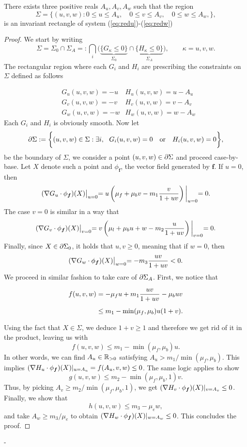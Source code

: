 \begin{proposition}
	There exists three positive reals $A_u, A_v, A_w$ such that the region $$\Sigma = \bigl\{(u, v, w) : 0 \le u \le A_u, \quad 0 \le v \le A_v, \quad  0 \le w \le A_w, \bigr\},$$ is an invariant rectangle of system (\ref{eq:redu})-(\ref{eq:redw})
\end{proposition}

\begin{proof}
	We start by writing $$\Sigma = \Sigma_0 \cap \Sigma_A =: \bigcap_i \biggl( \underbrace{\{G_\kappa \le 0\}}_{\Sigma_0} \cap \underbrace{\{H_\kappa \le 0\}}_{\Sigma_A}\biggr), \qquad \kappa = u, v, w.$$
	The rectangular region where each $G_i$ and $H_i$ are prescribing the constraints on $\Sigma$ defined as follows
	
	\begin{align*}
		& G_u(u, v, w) = -u & H_u(u, v, w) = u - A_u \\[1em]
		& G_v(u, v, w) = -v & H_v(u, v, w) = v - A_v \\[1em]
		& G_w(u, v, w) = -w & H_w(u, v, w) = w - A_w
	\end{align*}
Each $G_i$ and $H_i$ is obviously smooth. Now let $$\partial\Sigma := \biggl\{(u,v,w) \in \Sigma : \exists i, \ \  G_i(u, v, w) = 0 \quad\text{or}\quad H_i(u, v, w) = 0 \biggr\},$$ be the boundary of $\Sigma$, we consider a point  $(u, v, w) \in \partial \Sigma$ and proceed case-by-base. Let $X $ denote such a point and $\phi_{\bm f}$, the vector field generated by $\bm f$. If $u=0$, then $$(\nabla G_u \cdot \phi_{\bm f})(X)\bigl\vert_{u=0} = u \left( \mu_f  + \mu_b v - m_1 \dfrac{v}{1 + uv}\right)\biggl\vert_{u=0} = 0.$$ The case $v= 0$ is similar in a way that
$$(\nabla G_v \cdot \phi_{\bm f})(X)\bigl\vert_{v=0} = v \left( \mu_l  + \mu_b u + w - m_2 \dfrac{u}{1 + uv}\right)\biggl\vert_{v=0} = 0.$$ Finally, since $X \in \partial\Sigma_0$, it holds that $u, v \ge 0$, meaning that if $w=0$, then $$(\nabla G_w \cdot \phi_{\bm f})(X)\bigl\vert_{w=0} = -m_3 \dfrac{uv}{1 + uv} < 0.$$ We proceed in similar fashion to take care of $\partial\Sigma_A$. First, we notice that
	
	\begin{align}
		f(u, v, w) &= -\mu_fu + m_1 \dfrac{uv}{1 + uv} - \mu_b uv \notag \\[0.5em]
		& \le m_1 - \min(\mu_f, \mu_b) u (1 + v). \notag
	\end{align}
	
	Using the fact that $X \in \Sigma$, we deduce $1 + v \ge 1$ and therefore we get rid of it in the product, leaving us with 
	$$f(u, v, w) \le m_1 - \min(\mu_f, \mu_b) u.$$
	In other words, we can find $A_u \in \mathbb{R}_{>0}$ satisfying $A_u > m_1 / \min(\mu_f, \mu_b)$. This implies $(\nabla H_u \cdot \phi_{\bm f})(X)\vert_{u=A_u} = f(A_u, v, w) \le 0$. The same logic applies to show $$g(u, v, w) \le m_2 - \min(\mu_f, \mu_b, 1) v.$$ Thus, by picking $A_v \ge m_2 / \min(\mu_f, \mu_b, 1)$, we get $(\nabla H_v \cdot \phi_{\bm f})(X)\vert_{v=A_v} \le 0$. Finally, we show that $$h(u, v, w) \le m_3 - \mu_e w,$$ and take $A_w \ge m_3 / \mu_e$ to obtain $(\nabla H_w \cdot \phi_{\bm f})(X)\vert_{w=A_w} \le 0$. This concludes the proof.
\end{proof}-

